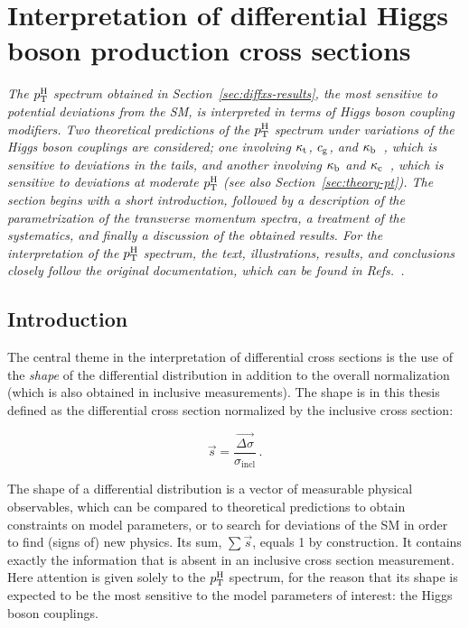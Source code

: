 \section{Interpretation of differential Higgs boson production cross sections}
\label{sec:interpretation}

\emph{%
The $p_\mathrm{T}^\mathrm{H}$ spectrum obtained in Section~\ref{sec:diffxs-results}, the most sensitive to potential deviations from the SM, is interpreted in terms of Higgs boson coupling modifiers.
% 
Two theoretical predictions of the $p_\mathrm{T}^\mathrm{H}$ spectrum under variations of the Higgs boson couplings are considered; one involving $\kappa_{\mathrm{t}}$, $c_\mathrm{g}$, and $\kappa_{\mathrm{b}}$~\cite{Grazzini:2017szg,Grazzini:2016paz}, which is sensitive to deviations in the tails, and another involving $\kappa_{\mathrm{b}}$ and $\kappa_{\mathrm{c}}$~\cite{Bishara:2016jga}, which is sensitive to deviations at moderate $p_\mathrm{T}^\mathrm{H}$ (see also Section~\ref{sec:theory-pt}).
% 
The section begins with a short introduction, followed by a description of the parametrization of the transverse momentum spectra, a treatment of the systematics, and finally a discussion of the obtained results.
% 
For the interpretation of the $p_\mathrm{T}^\mathrm{H}$ spectrum, the text, illustrations, results, and conclusions closely follow the original documentation, which can be found in Refs.~\cite{AN-17-244,HIG-17-028}.
}


\subsection{Introduction}

The central theme in the interpretation of differential cross sections is the use of the \emph{shape} of the differential distribution in addition to the overall normalization (which is also obtained in inclusive measurements).
% 
The shape is in this thesis defined as the differential cross section normalized by the inclusive cross section:
% 
\begin{linenomath*}
\begin{equation}
\label{eq:interpretation-shape}
\vec{s} = \frac{\vec{\Delta\sigma}}{\sigma_\text{incl}}
\,.
\end{equation}
\end{linenomath*}
% 
The shape of a differential distribution is a vector of measurable physical observables, which can be compared to theoretical predictions to obtain constraints on model parameters, or to search for deviations of the SM in order to find (signs of) new physics.
% 
Its sum, $\sum \vec{s}$, equals 1 by construction.
% 
It contains exactly the information that is absent in an inclusive cross section measurement.
% 
Here attention is given solely to the $p_\mathrm{T}^\mathrm{H}$ spectrum, for the reason that its shape is expected to be the most sensitive to the model parameters of interest: the Higgs boson couplings.


